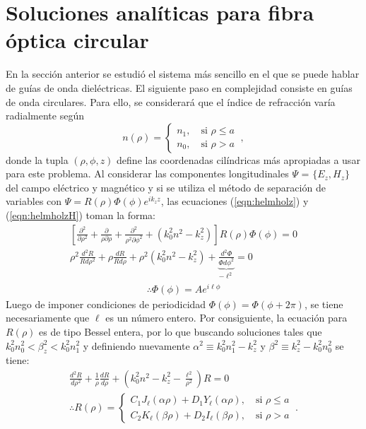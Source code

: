 \section{Soluciones analíticas para fibra óptica circular}
En la sección anterior se estudió el sistema más sencillo en el que se puede hablar de guías de onda dieléctricas. El siguiente paso en complejidad consiste en guías de onda circulares. Para ello, se considerará que el índice de refracción varía radialmente según 
\begin{equation}
	n( \rho ) = 
	\left\{\begin{matrix}
	n_1, \quad \text{si } \rho \le a
	\\
	n_0, \quad \text{si } \rho > a
	\end{matrix}\right.
	\ ,\nonumber
\end{equation}
donde la tupla $(\rho, \phi, z)$ define las coordenadas cilíndricas más apropiadas a usar para este problema. 
Al considerar las componentes longitudinales $\Psi$ = $\{E_z, H_z\}$ del campo eléctrico y magnético y  si se utiliza el método de separación de variables con $\Psi =  R(\rho)\Phi(\phi) e^{ik_z z} $,  las ecuaciones (\ref{eqn:helmholz}) y (\ref{eqn:helmholzH}) toman la forma:
\begin{align}
	\left[\frac{\partial^2}{\partial \rho^2} + \frac{\partial}{\rho\partial \rho} + \frac{\partial^2}{\rho^2\partial \phi^2} +\left( k_0^2n^2 - k_z^2 \right)\right]  R(\rho)\Phi(\phi) = 0
	\nonumber
	\\
\rho^2\frac{d^2 R}{Rd\rho^2} + \rho\frac{dR}{Rd\rho} + \rho^2\left( k_0^2n^2 - k_z^2 \right) + \underbrace{\frac{d^2 \Phi}{\Phi d\phi^2}}_{-\ell^2} = 0
\nonumber
\end{align}
\vspace{-3em}
\begin{align}
\therefore \Phi(\phi) = A e^{i\ell\phi}
\nonumber
\end{align}
Luego de imponer condiciones de periodicidad $\Phi(\phi)=\Phi(\phi + 2\pi)$, se tiene necesariamente que $\ell$ es un número entero. Por consiguiente, la ecuación para $R(\rho)$ es de tipo Bessel entera, por lo que buscando soluciones tales que $k_0^2 n_0^2 < \beta_z^2 < k_0^2 n_1^2$ y definiendo nuevamente $\alpha^2 \equiv k_0^2n_1^2 - k_z^2$ y $\beta^2\equiv k_z^2 - k_0^2n_0^2$ se tiene:
\begin{align}
	\frac{d^2 R}{d\rho^2} + \frac{1}{\rho}\frac{dR}{d\rho} + \left( k_0^2n^2 - k_z^2 -\frac{\ell^2}{\rho^2}\right)R  = 0
	\nonumber
	\\
	\therefore R(\rho) = 
	\left\{
	\begin{matrix}	
	C_1 J_\ell (\alpha\rho) + D_1 Y_\ell (\alpha\rho), \quad \text{si } \rho \le a  
	\\
	C_2 K_\ell (\beta\rho) + D_2 I_\ell (\beta\rho), \quad \text{si } \rho > a  
	\end{matrix}
	\right.
	\ . \nonumber
\end{align}
